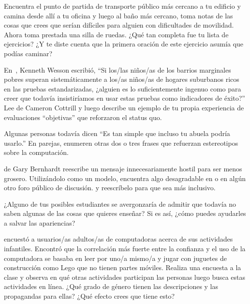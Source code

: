 
Encuentra el punto de partida de transporte público más cercano a tu edificio
y camina desde allí a tu oficina y luego al baño más cercano,
toma notas de las cosas que crees que serían difíciles para alguien con dificultades de movilidad.
Ahora toma prestada una silla de ruedas.
¿Qué tan completa fue tu lista de ejercicios?
¿Y te diste cuenta que la primera oración de este ejercicio asumía que podías caminar?


En~\cite{Litt2004},
Kenneth Wesson escribió,
``Si los/las niños/as de los barrios marginales pobres superan sistemáticamente a los/as niños/as de hogares suburbanos ricos en las pruebas estandarizadas,
¿alguien es lo suficientemente ingenuo como para creer que todavía insistiríamos en usar estas pruebas como indicadores de éxito?''
Lee 
de Cameron Cottrill
y luego describe un ejemplo de tu propia experiencia de evaluaciones ``objetivas'' que reforzaron el status quo.


Algunas personas todavía dicen ``Es tan simple que incluso tu abuela podría usarlo.''
En parejas,
enumeren otras dos o tres frases que refuerzan estereotipos sobre la computación.


de Gary Bernhardt
reescribe un mensaje innecesariamente hostil para ser menos grosero.
Utilizándolo como un modelo,
encuentra algo desagradable en  o en algún otro foro público de discusión.
y reescríbelo para que sea más inclusivo.


¿Alguno de tus posibles estudiantes se avergonzaría de admitir que
todavía no saben algunas de las cosas que quieres enseñar?
Si es así,
¿cómo puedes ayudarles a salvar las apariencias?


\cite{Cutt2017} encuestó a usuarios/as adultos/as de computadoras acerca de sus actividades infantiles.
Encontró que la correlación más fuerte entre la confianza y el uso de la computadora
se basaba en leer por uno/a mismo/a y jugar con juguetes de construcción como Lego que no tienen partes móviles.
Realiza una encuesta a la clase y observa en qué otras actividades participan las personas
luego busca estas actividades en línea.
¿Qué grado de género tienen las descripciones y las propagandas para ellas?
¿Qué efecto crees que tiene esto?


